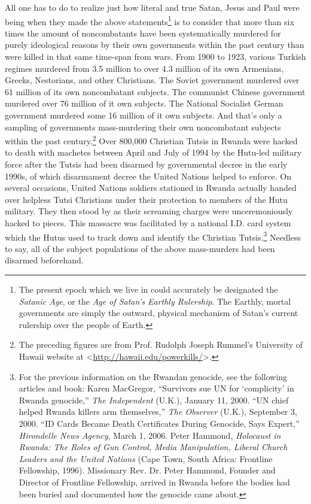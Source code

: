 \documentclass[letterpaper,12pt]{article}
\begin{document}
All one has to do to realize just how literal and true Satan, Jesus and Paul were being when they made the above statements\footnote{The present epoch which we live in could accurately be designated the \emph{Satanic Age}, or the \emph{Age of Satan's Earthly Rulership}. The Earthly, mortal governments are simply the outward, physical mechanism of Satan's current rulership over the people of Earth.} is to consider that more than six times the amount of noncombatants have been systematically murdered for purely ideological reasons by their own governments within the past century than were killed in that same time-span from wars. From 1900 to 1923, various Turkish regimes murdered from 3.5 million to over 4.3 million of its own Armenians, Greeks, Nestorians, and other Christians. The Soviet government murdered over 61 million of its own noncombatant subjects. The communist Chinese government murdered over 76 million of it own subjects. The National Socialist German government murdered some 16 million of it own subjects. And that's only a sampling of governments mass-murdering their own noncombatant subjects within the past century.\footnote{The preceding figures are from Prof. Rudolph Joseph Rummel's University of Hawaii website at \textless\url{http://hawaii.edu/powerkills/}\textgreater .} Over 800,000 Christian Tutsis in Rwanda were hacked to death with machetes between April and July of 1994 by the Hutu-led military force after the Tutsis had been disarmed by governmental decree in the early 1990s, of which disarmament decree the United Nations helped to enforce. On several occasions, United Nations soldiers stationed in Rwanda actually handed over helpless Tutsi Christians under their protection to members of the Hutu military. They then stood by as their screaming charges were unceremoniously hacked to pieces. This massacre was facilitated by a national I.D. card system which the Hutus used to track down and identify the Christian Tutsis.\footnote{For the previous information on the Rwandan genocide, see the following articles and book: Karen MacGregor, ``Survivors sue UN for `complicity' in Rwanda genocide,'' \emph{The Independent} (U.K.), January 11, 2000. ``UN chief helped Rwanda killers arm themselves,'' \emph{The Observer} (U.K.), September 3, 2000. ``ID Cards Became Death Certificates During Genocide, Says Expert,'' \emph{Hirondelle News Agency}, March 1, 2006. Peter Hammond, \emph{Holocaust in Rwanda: The Roles of Gun Control, Media Manipulation, Liberal Church Leaders and the United Nations} (Cape Town, South Africa: Frontline Fellowship, 1996). Missionary Rev. Dr. Peter Hammond, Founder and Director of Frontline Fellowship, arrived in Rwanda before the bodies had been buried and documented how the genocide came about.} Needless to say, all of the subject populations of the above mass-murders had been disarmed beforehand.
\end{document}
